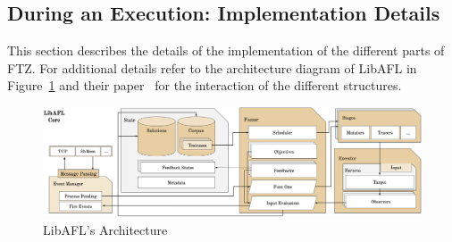 \documentclass{article}
\newcommand{\proj}{FTZ\xspace}
\let\savedCite=\cite
\renewcommand{\cite}{\unskip~\savedCite}
\begin{document}
\begin{multicols}{2}
  \subsection{During an Execution: Implementation Details}

  This section describes the details of the implementation of the different parts of \proj. For additional details refer to the architecture diagram of LibAFL in Figure~\ref{fig:LibAFLArchitecture} and their paper\cite{LibAFL} for the interaction of the different structures.

\end{multicols}
\vspace{1em}
\begin{figure}[htb]
  \centering
  \includegraphics[width=\textwidth]{assets/LibAFLArchitecture.png}
  \caption{LibAFL's Architecture\cite{LibAFL}}
  \label{fig:LibAFLArchitecture}
\end{figure}
\end{document}
